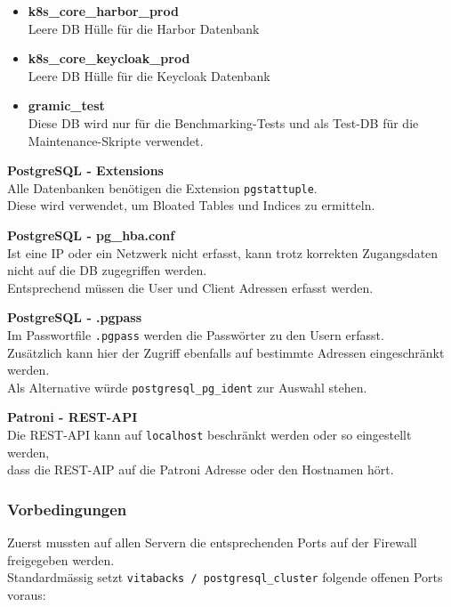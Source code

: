 \begin{flushleft}
\begin{description}
\begin{itemize}
            \item \textbf{k8s\_core\_harbor\_prod}\hfill \\Leere DB Hülle für die \Gls{Harbor} Datenbank
            \item \textbf{k8s\_core\_keycloak\_prod}\hfill \\Leere DB Hülle für die \Gls{Keycloak} Datenbank
            \item \textbf{gramic\_test}\hfill \\Diese DB wird nur für die Benchmarking-Tests und als Test-DB für die Maintenance-Skripte verwendet.
        \end{itemize}
        \item \textbf{PostgreSQL - Extensions}\hfill \\Alle Datenbanken benötigen die Extension \texttt{pgstattuple}.\\Diese wird verwendet, um Bloated Tables und Indices zu ermitteln.
        \item \textbf{PostgreSQL - pg\_hba.conf}\hfill \\Ist eine IP oder ein Netzwerk nicht erfasst, kann trotz korrekten Zugangsdaten nicht auf die DB zugegriffen werden.\\Entsprechend müssen die User und Client Adressen erfasst werden.
        \item \textbf{PostgreSQL - .pgpass}\hfill \\Im Passwortfile \texttt{.pgpass} werden die Passwörter zu den Usern erfasst.\\Zusätzlich kann hier der Zugriff ebenfalls auf bestimmte Adressen eingeschränkt werden.\\Als Alternative würde \texttt{postgresql\_pg\_ident} zur Auswahl stehen.
        \item \textbf{Patroni - REST-API}\hfill \\Die REST-API kann auf \texttt{localhost} beschränkt werden oder so eingestellt werden,\\dass die REST-AIP auf die Patroni Adresse oder den Hostnamen hört.
    \end{description}
\end{flushleft}
\begin{flushleft}
    \subsubsection{Vorbedingungen}
    Zuerst mussten auf allen Servern die entsprechenden Ports auf der Firewall freigegeben werden.\\
    Standardmässig setzt \texttt{vitabacks / postgresql\_cluster} folgende offenen Ports voraus:
    
\end{flushleft}
